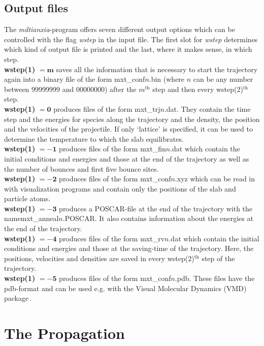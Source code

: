 \documentclass[twoside, 11pt, titlepage, captions=nooneline, a4paper, headsepline]{scrbook}%
\begin{document}
\subsection{Output files}
\label{Sec:mxt:output}
The \textit{mdtianxia}-program offers seven different output options which can be controlled with the flag \textit{wstep} in the input file. The first slot for \textit{wstep} determines which kind of output file is printed and the last, where it makes sense, in which step.
\\
\textbf{wstep(1)} $\mathbf{=m}$ saves all the information that is necessary to start the trajectory again into a binary file of the form mxt\_conf$n$.bin (where $n$ can be any number between 99999999 and 00000000) after the $m^\mathrm{th}$ step and then every wstep(2)$^\mathrm{th}$ step.\\
\textbf{wstep(1)} $\mathbf{=0}$ produces files of the form mxt\_trj$n$.dat. They contain the time step and the energies for species along the trajectory and the density, the position and the velocities of the projectile. If only `lattice' is specified, it can be used to determine the temperature to which the slab equilibrates.\\
\textbf{wstep(1)} $\mathbf{=-1}$ produces files of the form mxt\_fin$n$.dat which contain the initial conditions and energies and those at the end of the trajectory as well as the number of bounces and first five bounce sites.\\ 
\textbf{wstep(1)} $\mathbf{=-2}$ produces files of the form mxt\_conf$n$.xyz which can be read in with visualization programs and contain only the positions of the slab and particle atoms.\\
\textbf{wstep(1)} $\mathbf{=-3}$ produces a POSCAR-file at the end of the trajectory with the name\linebreak mxt\_anneal$n$.POSCAR. It also contains information about the energies at the end of the trajectory.\\
\textbf{wstep(1)} $\mathbf{=-4}$ produces files of the form mxt\_rv$n$.dat which contain the initial conditions and energies and those at the saving-time of the trajectory. Here, the positions, velocities and densities are saved in every wstep(2)$^\mathrm{th}$ step of the trajectory.\\
\textbf{wstep(1)} $\mathbf{=-5}$ produces files of the form mxt\_conf$n$.pdb. These files have the pdb-format and can be used e.g. with the Visual Molecular Dynamics (VMD) package\,\cite{humphrey1996}.

\section{The Propagation}
\end{document}
